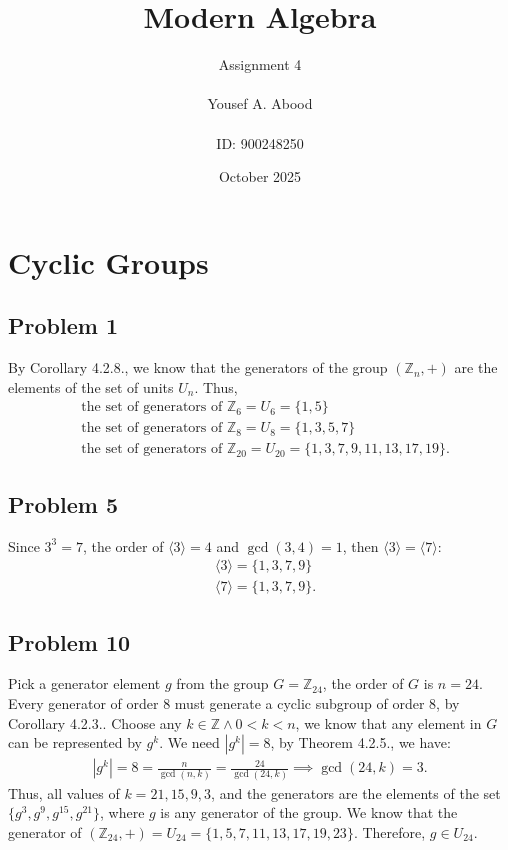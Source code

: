\documentclass[a4paper,12pt]{article}
\title{Modern Algebra}
\author{Assignment 4\\ \\ Yousef A. Abood\\ \\ ID: 900248250}
\date{October 2025}
\begin{document}
\maketitle
\noindent\makebox[\linewidth]{\rule{15cm}{0.4pt}}
\section{Cyclic Groups}
\subsection*{Problem 1}
    By Corollary 4.2.8., we know that the generators of the group $(\mathbb{Z}_n,+)$ are the elements of the set of units $U_n.$ Thus,
    \begin{align*}
        &\text{the set of generators of } \mathbb{Z}_6 = U_6=\{1,5\} \\
        &\text{the set of generators of } \mathbb{Z}_8 = U_8=\{1,3,5,7\}\\
        &\text{the set of generators of } \mathbb{Z}_{20} = U_{20}=\{1,3,7,9,11,13,17,19\}.
    \end{align*}
\subsection*{Problem 5}
Since $3^3=7$, the order of $\langle 3\rangle=4$ and $\gcd(3,4)=1$, then $\langle 3\rangle=\langle 7\rangle$:
\begin{align*}
    &\langle 3\rangle=\{1,3,7,9\}\\
    &\langle 7\rangle=\{1,3,7,9\}.
\end{align*}
\subsection*{Problem 10}
Pick a generator element $g$ from the group $G=\mathbb{Z}_{24}$, the order of $G$ is $n=24$. Every generator of order $8$ must generate a cyclic subgroup of order $8$, by Corollary 4.2.3..
Choose any $k\in \mathbb{Z} \wedge 0 < k<n$, we know that any element in $G$ can be represented by $g^k$. We need $|g^k|=8$, by Theorem 4.2.5., we have:
\begin{align*}
    |g^k|= 8= \frac{n}{\gcd(n,k)}=\frac{24}{\gcd(24,k)} \implies \gcd(24,k)=3.
\end{align*}
Thus, all values of $k=21,15,9,3$, and the generators are the elements of the set $\{g^3,g^9,g^{15},g^{21}\}$, where $g$ is any generator of the group. We know that the generator of $(\mathbb{Z}_{24},+)=U_{24}=\{1,5,7,11,13,17,19,23\}.$ Therefore, $g \in U_{24}.$
\end{document}
